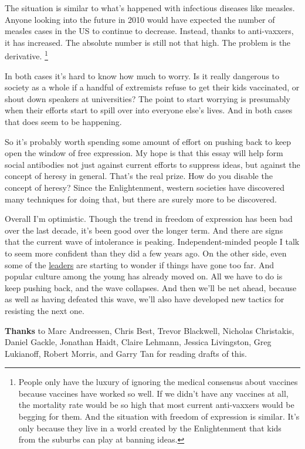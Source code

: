 The situation is similar to what's happened with infectious diseases
like measles. Anyone looking into the future in 2010 would have expected
the number of measles cases in the US to continue to decrease. Instead,
thanks to anti-vaxxers, it has increased. The absolute number is still
not that high. The problem is the derivative. \footnote{People only have the luxury of ignoring the medical consensus
about vaccines because vaccines have worked so well. If we didn't have
any vaccines at all, the mortality rate would be so high that most
current anti-vaxxers would be begging for them. And the situation with
freedom of expression is similar. It's only because they live in a world
created by the Enlightenment that kids from the suburbs can play at
banning ideas.}

In both cases it's hard to know how much to worry. Is it really
dangerous to society as a whole if a handful of extremists refuse to get
their kids vaccinated, or shout down speakers at universities? The point
to start worrying is presumably when their efforts start to spill over
into everyone else's lives. And in both cases that does seem to be
happening.

So it's probably worth spending some amount of effort on pushing back to
keep open the window of free expression. My hope is that this essay will
help form social antibodies not just against current efforts to suppress
ideas, but against the concept of heresy in general. That's the real
prize. How do you disable the concept of heresy? Since the
Enlightenment, western societies have discovered many techniques for
doing that, but there are surely more to be discovered.

Overall I'm optimistic. Though the trend in freedom of expression has
been bad over the last decade, it's been good over the longer term. And
there are signs that the current wave of intolerance is peaking.
Independent-minded people I talk to seem more confident than they did a
few years ago. On the other side, even some of the
\href{https://www.nytimes.com/2022/03/18/opinion/cancel-culture-free-speech-poll.html}{leaders}
are starting to wonder if things have gone too far. And popular culture
among the young has already moved on. All we have to do is keep pushing
back, and the wave collapses. And then we'll be net ahead, because as
well as having defeated this wave, we'll also have developed new tactics
for resisting the next one.


\textbf{Thanks} to Marc Andreessen, Chris Best, Trevor Blackwell,
Nicholas Christakis, Daniel Gackle, Jonathan Haidt, Claire Lehmann,
Jessica Livingston, Greg Lukianoff, Robert Morris, and Garry Tan for
reading drafts of this.
